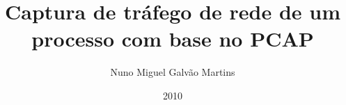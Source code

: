 \documentclass[pt,msc,twoside,12pt]{thesisdifctunl}
\title{Captura de tráfego de rede de um processo com base no PCAP}
\author{Nuno Miguel Galvão Martins}
\date{2010}
\begin{document}
\frontmatter

\frontpage

\presentationpage

\printdedicatory

\printacknowledgements

\printabstract

\tableofcontents 

\printotherlists 

\printchapters

\printbibliography

\printappendixes 

\end{document}
